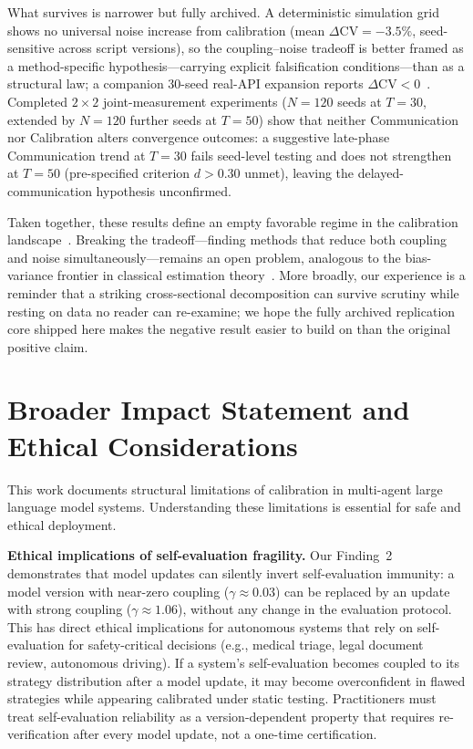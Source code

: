 \documentclass[11pt]{article}
\newcommand{\CV}{\ensuremath{\mathrm{CV}}}
\theoremstyle{definition}
\theoremstyle{remark}
\begin{document}
What survives is narrower but fully archived. A deterministic simulation grid shows no universal noise increase from calibration (mean $\Delta\CV = -3.5\%$, seed-sensitive across script versions), so the coupling--noise tradeoff is better framed as a method-specific hypothesis---carrying explicit falsification conditions---than as a structural law; a companion 30-seed real-API expansion reports $\Delta\CV < 0$~\citep{companion2026}. Completed $2 \times 2$ joint-measurement experiments ($N{=}120$ seeds at $T{=}30$, extended by $N{=}120$ further seeds at $T{=}50$) show that neither Communication nor Calibration alters convergence outcomes: a suggestive late-phase Communication trend at $T{=}30$ fails seed-level testing and does not strengthen at $T{=}50$ (pre-specified criterion $d > 0.30$ unmet), leaving the delayed-communication hypothesis unconfirmed.

Taken together, these results define an empty favorable regime in the calibration landscape~\citep{cover2012elements}. Breaking the tradeoff---finding methods that reduce both coupling and noise simultaneously---remains an open problem, analogous to the bias-variance frontier in classical estimation theory~\citep{lehmann1998theory}. More broadly, our experience is a reminder that a striking cross-sectional decomposition can survive scrutiny while resting on data no reader can re-examine; we hope the fully archived replication core shipped here makes the negative result easier to build on than the original positive claim.

\section*{Broader Impact Statement and Ethical Considerations}

This work documents structural limitations of calibration in multi-agent large language model systems. Understanding these limitations is essential for safe and ethical deployment.

\textbf{Ethical implications of self-evaluation fragility.} Our Finding~2 demonstrates that model updates can silently invert self-evaluation immunity: a model version with near-zero coupling ($\gamma \approx 0.03$) can be replaced by an update with strong coupling ($\gamma \approx 1.06$), without any change in the evaluation protocol. This has direct ethical implications for autonomous systems that rely on self-evaluation for safety-critical decisions (e.g., medical triage, legal document review, autonomous driving). If a system's self-evaluation becomes coupled to its strategy distribution after a model update, it may become overconfident in flawed strategies while appearing calibrated under static testing. Practitioners must treat self-evaluation reliability as a version-dependent property that requires re-verification after every model update, not a one-time certification.
\end{document}
